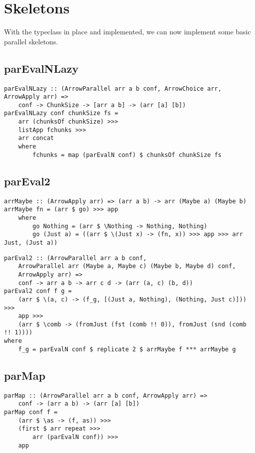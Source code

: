 \section{Skeletons}
With the  typeclass in place and implemented, we can now implement some basic parallel skeletons.

\subsection{parEvalNLazy}
\begin{lstlisting}[frame=htrbl]
parEvalNLazy :: (ArrowParallel arr a b conf, ArrowChoice arr, ArrowApply arr) =>
	conf -> ChunkSize -> [arr a b] -> (arr [a] [b])
parEvalNLazy conf chunkSize fs =
	arr (chunksOf chunkSize) >>>
	listApp fchunks >>>
	arr concat
	where
		fchunks = map (parEvalN conf) $ chunksOf chunkSize fs
\end{lstlisting}
\frbreak

\subsection{parEval2}
\begin{lstlisting}[frame=htrbl]
arrMaybe :: (ArrowApply arr) => (arr a b) -> arr (Maybe a) (Maybe b)
arrMaybe fn = (arr $ go) >>> app
	where 
		go Nothing = (arr $ \Nothing -> Nothing, Nothing)
		go (Just a) = ((arr $ \(Just x) -> (fn, x)) >>> app >>> arr Just, (Just a))
\end{lstlisting}
\frbreak

\begin{lstlisting}[frame=htrbl]
parEval2 :: (ArrowParallel arr a b conf,
	ArrowParallel arr (Maybe a, Maybe c) (Maybe b, Maybe d) conf,
	ArrowApply arr) =>
	conf -> arr a b -> arr c d -> (arr (a, c) (b, d))
parEval2 conf f g =
	(arr $ \(a, c) -> (f_g, [(Just a, Nothing), (Nothing, Just c)])) >>>
	app >>>
	(arr $ \comb -> (fromJust (fst (comb !! 0)), fromJust (snd (comb !! 1))))
where
	f_g = parEvalN conf $ replicate 2 $ arrMaybe f *** arrMaybe g
\end{lstlisting}

\frbreak
\subsection{parMap}
\begin{lstlisting}[frame=htrbl]
parMap :: (ArrowParallel arr a b conf, ArrowApply arr) =>
	conf -> (arr a b) -> (arr [a] [b])
parMap conf f =
	(arr $ \as -> (f, as)) >>>
	(first $ arr repeat >>>
		arr (parEvalN conf)) >>>
	app
\end{lstlisting}

